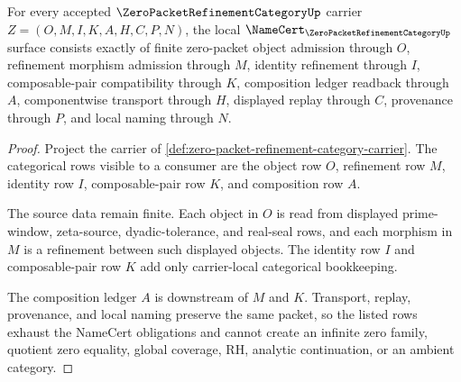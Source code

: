 \begin{theorem}
\label{thm:zero-packet-refinement-category-namecert-obligations}
For every accepted $\ZeroPacketRefinementCategoryUp$ carrier $Z=(O,M,I,K,A,H,C,P,N)$, the local $\NameCert_{\ZeroPacketRefinementCategoryUp}$ surface consists exactly of finite zero-packet object admission through $O$, refinement morphism admission through $M$, identity refinement through $I$, composable-pair compatibility through $K$, composition ledger readback through $A$, componentwise transport through $H$, displayed replay through $C$, provenance through $P$, and local naming through $N$.
\end{theorem}
\begin{proof}
Project the carrier of \autoref{def:zero-packet-refinement-category-carrier}. The categorical rows visible to a consumer are the object row $O$, refinement row $M$, identity row $I$, composable-pair row $K$, and composition row $A$.

The source data remain finite. Each object in $O$ is read from displayed prime-window, zeta-source, dyadic-tolerance, and real-seal rows, and each morphism in $M$ is a refinement between such displayed objects. The identity row $I$ and composable-pair row $K$ add only carrier-local categorical bookkeeping.

The composition ledger $A$ is downstream of $M$ and $K$. Transport, replay, provenance, and local naming preserve the same packet, so the listed rows exhaust the NameCert obligations and cannot create an infinite zero family, quotient zero equality, global coverage, RH, analytic continuation, or an ambient category.
\end{proof}

